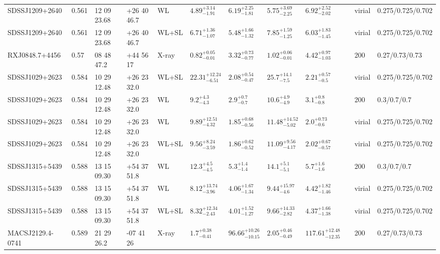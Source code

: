 \begin{landscape}
\begin{center}
{\begin{longtable}{llllllllllll}
SDSSJ1209+2640 & 0.561 & 12 09 23.68 & +26 40 46.7 & WL & ${4.89}^{+3.14}_{-1.91}$ & ${6.19}^{+2.25}_{-1.81}$ & ${5.75}^{+3.69}_{-2.25}$ & ${6.92}^{+2.52}_{-2.02}$ & \citet{OG12.1} & virial & 0.275/0.725/0.702 \\
SDSSJ1209+2640 & 0.561 & 12 09 23.68 & +26 40 46.7 & WL+SL & ${6.71}^{+1.36}_{-1.07}$ & ${5.48}^{+1.66}_{-1.32}$ & ${7.85}^{+1.59}_{-1.25}$ & ${6.03}^{+1.83}_{-1.45}$ & \citet{OG12.1} & virial & 0.275/0.725/0.702 \\
RXJ0848.7+4456 & 0.57 & 08 48 47.2 & +44 56 17 & X-ray & ${0.82}^{+0.05}_{-0.01}$ & ${3.32}^{+0.73}_{-0.77}$ & ${1.02}^{+0.06}_{-0.01}$ & ${4.42}^{+0.97}_{-1.03}$ & \citet{BA14.1} & 200 & 0.27/0.73/0.73 \\
SDSSJ1029+2623 & 0.584 & 10 29 12.48 & +26 23 32.0 & WL+SL & ${22.31}^{+12.24}_{-6.51}$ & ${2.08}^{+0.54}_{-0.47}$ & ${25.7}^{+14.1}_{-7.5}$ & ${2.21}^{+0.57}_{-0.5}$ & \citet{OG13.1} & virial & 0.275/0.725/0.702 \\
SDSSJ1029+2623 & 0.584 & 10 29 12.48 & +26 23 32.0 & WL & ${9.2}^{+4.3}_{-4.3}$ & ${2.9}^{+0.7}_{-0.7}$ & ${10.6}^{+4.9}_{-4.9}$ & ${3.1}^{+0.8}_{-0.8}$ & \citet{SE14.1} & 200 & 0.3/0.7/0.7 \\
SDSSJ1029+2623 & 0.584 & 10 29 12.48 & +26 23 32.0 & WL & ${9.89}^{+12.51}_{-4.32}$ & ${1.85}^{+0.68}_{-0.56}$ & ${11.48}^{+14.52}_{-5.02}$ & ${2.0}^{+0.73}_{-0.6}$ & \citet{OG12.1} & virial & 0.275/0.725/0.702 \\
SDSSJ1029+2623 & 0.584 & 10 29 12.48 & +26 23 32.0 & WL+SL & ${9.56}^{+8.24}_{-3.59}$ & ${1.86}^{+0.62}_{-0.52}$ & ${11.09}^{+9.56}_{-4.17}$ & ${2.02}^{+0.67}_{-0.57}$ & \citet{OG12.1} & virial & 0.275/0.725/0.702 \\
SDSSJ1315+5439 & 0.588 & 13 15 09.30 & +54 37 51.8 & WL & ${12.3}^{+4.5}_{-4.5}$ & ${5.3}^{+1.4}_{-1.4}$ & ${14.1}^{+5.1}_{-5.1}$ & ${5.7}^{+1.6}_{-1.6}$ & \citet{SE14.1} & 200 & 0.3/0.7/0.7 \\
SDSSJ1315+5439 & 0.588 & 13 15 09.30 & +54 37 51.8 & WL & ${8.12}^{+13.74}_{-3.96}$ & ${4.06}^{+1.67}_{-1.34}$ & ${9.44}^{+15.97}_{-4.6}$ & ${4.42}^{+1.82}_{-1.46}$ & \citet{OG12.1} & virial & 0.275/0.725/0.702 \\
SDSSJ1315+5439 & 0.588 & 13 15 09.30 & +54 37 51.8 & WL+SL & ${8.32}^{+12.34}_{-2.43}$ & ${4.01}^{+1.52}_{-1.27}$ & ${9.66}^{+14.33}_{-2.82}$ & ${4.37}^{+1.66}_{-1.38}$ & \citet{OG12.1} & virial & 0.275/0.725/0.702 \\
MACSJ2129.4-0741 & 0.589 & 21 29 26.2 & -07 41 26 & X-ray & ${1.7}^{+0.38}_{-0.41}$ & ${96.66}^{+10.26}_{-10.15}$ & ${2.05}^{+0.46}_{-0.49}$ & ${117.61}^{+12.48}_{-12.35}$ & \citet{BA14.1} & 200 & 0.27/0.73/0.73 \\

\end{longtable}}
\end{center}
\end{landscape}
